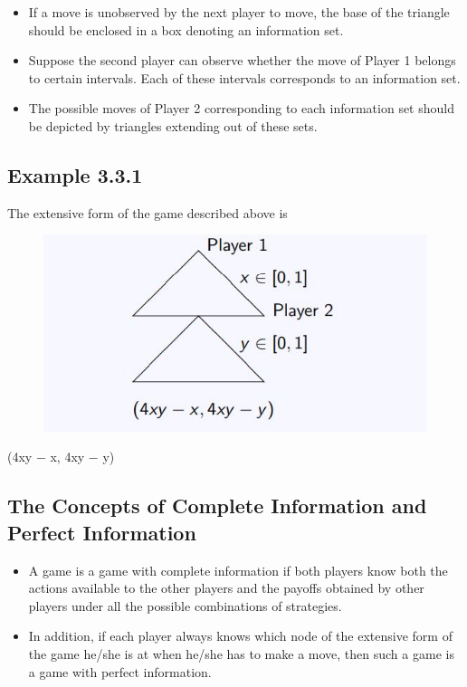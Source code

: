 \documentclass[]{report}
\begin{document}
\begin{itemize}
	\item If a move is unobserved by the next player to move, the base of the
	triangle should be enclosed in a box denoting an information set.
	\item Suppose the second player can observe whether the move of Player
	1 belongs to certain intervals. Each of these intervals corresponds
	to an information set.
	\item  The possible moves of Player 2 corresponding to each information
	set should be depicted by triangles extending out of these sets. 
\end{itemize}

\subsection{Example 3.3.1}
The extensive form of the game described above is

\begin{figure}
\centering
\includegraphics[width=0.7\linewidth]{images/DR5-Slide31}
\caption{}
\label{fig:DR5-Slide31}
\end{figure}

(4xy − x, 4xy − y)
\subsection{The Concepts of Complete Information and Perfect
	Information}
\begin{itemize}
	\item A game is a game with complete information if both players
	know both the actions available to the other players and the
	payoffs obtained by other players under all the possible
	combinations of strategies.
\item 	In addition, if each player always knows which node of the
	extensive form of the game he/she is at when he/she has to make
	a move, then such a game is a game with perfect information.
\end{itemize}
\end{document}
